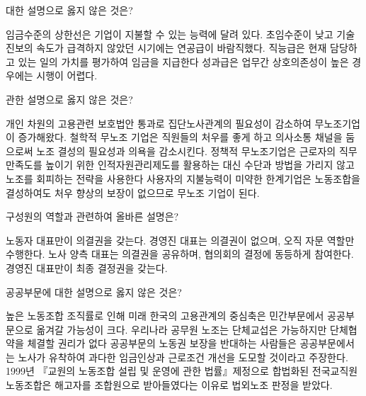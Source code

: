\documentclass[11pt,answers]{exam} %
\begin{document}
\begin{questions}

 대한 설명으로 옳지 않은 것은?
    \begin{choices}
    \choice\relax 임금수준의 상한선은 기업이 지불할 수 있는 능력에 달려 있다.
    \choice\relax 초임수준이 낮고 기술진보의 속도가 급격하지 않았던 시기에는 연공급이 바람직했다. 
    \CorrectChoice\relax 직능급은 현재 담당하고 있는 일의 가치를 평가하여 임금을 지급한다
    \choice\relax 성과급은 업무간 상호의존성이 높은 경우에는 시행이 어렵다. 
    \end{choices}

 관한 설명으로 옳지 않은 것은? 
    \begin{choices}
    \choice\relax 개인 차원의 고용관련 보호법안 통과로 집단노사관계의 필요성이 감소하여 무노조기업이 증가해왔다.
    \choice\relax 철학적 무노조 기업은 직원들의 처우를 좋게 하고 의사소통 채널을 둠으로써 노조 결성의 필요성과 의욕을 감소시킨다.  
    \CorrectChoice\relax 정책적 무노조기업은 근로자의 직무만족도를 높이기 위한 인적자원관리제도를 활용하는 대신 수단과 방법을 가리지 않고 노조를 회피하는 전략을 사용한다 
    \choice\relax 사용자의 지불능력이 미약한 한계기업은 노동조합을 결성하여도 처우 향상의 보장이 없으므로 무노조 기업이 된다.  
    \end{choices}

 구성원의 역할과 관련하여 올바른 설명은?
    \begin{choices}
    \choice\relax 노동자 대표만이 의결권을 갖는다.
    \choice\relax 경영진 대표는 의결권이 없으며, 오직 자문 역할만 수행한다.
    \CorrectChoice\relax 노사 양측 대표는 의결권을 공유하며, 협의회의 결정에 동등하게 참여한다.
    \choice\relax 경영진 대표만이 최종 결정권을 갖는다.
    \end{choices}

 공공부문에 대한 설명으로 옳지 않은 것은?
    \begin{choices}
    \choice\relax 높은 노동조합 조직률로 인해 미래 한국의 고용관계의 중심축은 민간부문에서 공공부문으로 옮겨갈 가능성이 크다.
    \CorrectChoice\relax 우리나라 공무원 노조는 단체교섭은 가능하지만 단체협약을 체결할 권리가 없다
    \choice\relax 공공부문의 노동권 보장을 반대하는 사람들은 공공부문에서는 노사가 유착하여 과다한 임금인상과 근로조건 개선을 도모할 것이라고 주장한다. 
    \choice\relax 1999년 『교원의 노동조합 설립 및 운영에 관한 법률』제정으로 합법화된 전국교직원노동조합은 해고자를 조합원으로 받아들였다는 이유로 법외노조 판정을 받았다. 
    \end{choices}


\end{questions}
\end{document}
